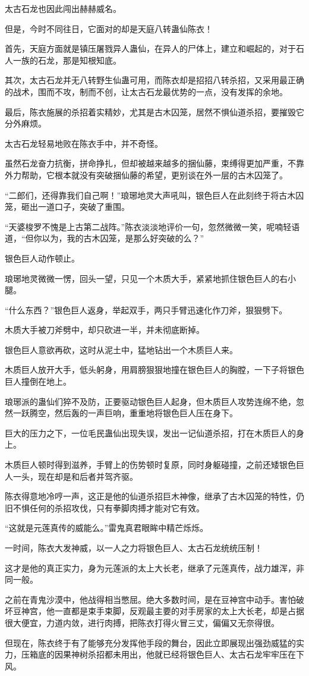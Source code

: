 \begin{this_body}
太古石龙也因此闯出赫赫威名。

但是，今时不同往日，它面对的却是天庭八转蛊仙陈衣！

首先，天庭方面就是镇压屠戮异人蛊仙，在异人的尸体上，建立和崛起的，对于石人一族的石龙，那是知根知底。

其次，太古石龙并无八转野生仙蛊可用，而陈衣却是招招八转杀招，又采用最正确的战术，围而不攻，制而不创，让太古石龙最优势的一点，没有发挥的余地。

最后，陈衣施展的杀招着实精妙，尤其是古木囚笼，居然不惧仙道杀招，要摧毁它分外麻烦。

太古石龙轻易地败在陈衣手中，并不奇怪。

虽然石龙奋力抗衡，拼命挣扎，但却被越来越多的捆仙藤，束缚得更加严重，不靠外力帮助，它根本就没有突破捆仙藤的希望，更别谈在外一层的古木囚笼了。

“二郎们，还得靠我们自己啊！”琅琊地灵大声吼叫，银色巨人在此刻终于将古木囚笼，砸出一道口子，突破了重围。

“天婆梭罗不愧是上古第二战阵。”陈衣淡淡地评价一句，忽然微微一笑，呢喃轻语道，“但你以为，我的古木囚笼，是那么好突破的么？”

银色巨人动作顿止。

琅琊地灵微微一愣，回头一望，只见一个木质大手，紧紧地抓住银色巨人的右小腿。

“什么东西？”银色巨人返身，举起双手，两只手臂迅速化作刀斧，狠狠劈下。

木质大手被刀斧劈中，却只砍进一半，并未彻底断掉。

银色巨人意欲再砍，这时从泥土中，猛地钻出一个木质巨人来。

木质巨人放开大手，低头躬身，用肩膀狠狠地撞在银色巨人的胸膛，一下子将银色巨人撞倒在地上。

琅琊派的蛊仙们猝不及防，正要驱动银色巨人起身，但木质巨人攻势连绵不绝，忽然一跃腾空，然后轰的一声巨响，重重地将银色巨人压在身下。

巨大的压力之下，一位毛民蛊仙出现失误，发出一记仙道杀招，打在木质巨人的身上。

木质巨人顿时得到滋养，手臂上的伤势顿时复原，同时身躯碰撞，之前还矮银色巨人一头，现在却是和后者并驾齐驱。

陈衣得意地冷哼一声，这正是他的仙道杀招巨木神像，继承了古木囚笼的特性，仍旧不惧任何的杀招攻伐，只有拳脚肉搏才能对它有效。

“这就是元莲真传的威能么。”雷鬼真君眼眸中精芒烁烁。

一时间，陈衣大发神威，以一人之力将银色巨人、太古石龙统统压制！

这才是他的真正实力，身为元莲派的太上大长老，继承了元莲真传，战力雄浑，非同一般。

之前在青鬼沙漠中，他战得相当憋屈。绝大多数时间，是在豆神宫中动手。害怕破坏豆神宫，他一直都是束手束脚，反观最主要的对手房家的太上大长老，却是占据很大便宜，力道内敛，进行肉搏，把陈衣打得火冒三丈，偏偏又无奈得很。

但现在，陈衣终于有了能够充分发挥他手段的舞台，因此立即展现出强劲威猛的实力，压箱底的因果神树杀招都未用出，他就已经将银色巨人、太古石龙牢牢压在下风。

\end{this_body}

